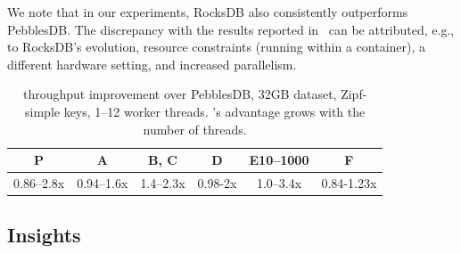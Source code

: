 We note that in our experiments, RocksDB also consistently outperforms PebblesDB. 
The discrepancy with the results reported in~\cite{PebblesDB} 
can be attributed, e.g., to RocksDB's evolution, resource constraints (running within a 
container), a different hardware setting, and increased  parallelism.   

\begin{table}
\centering
{\small{
\begin{tabular}{cccccc}
P & A & B, C & D& E10--1000 & F \\
\hline 
0.86--2.8x & 0.94--1.6x & 1.4--2.3x &  0.98-2x & 1.0--3.4x &  0.84-1.23x  \\
\end{tabular}
}}
\caption{{\sys\/ throughput improvement over PebblesDB, 32GB dataset, Zipf-simple keys, 1--12 worker threads.
\sys's advantage grows with the number of threads.}}
\label{fig:pebbels-throughput}
\end{table}

\subsection{Insights}
\label{ssec:drill} 








